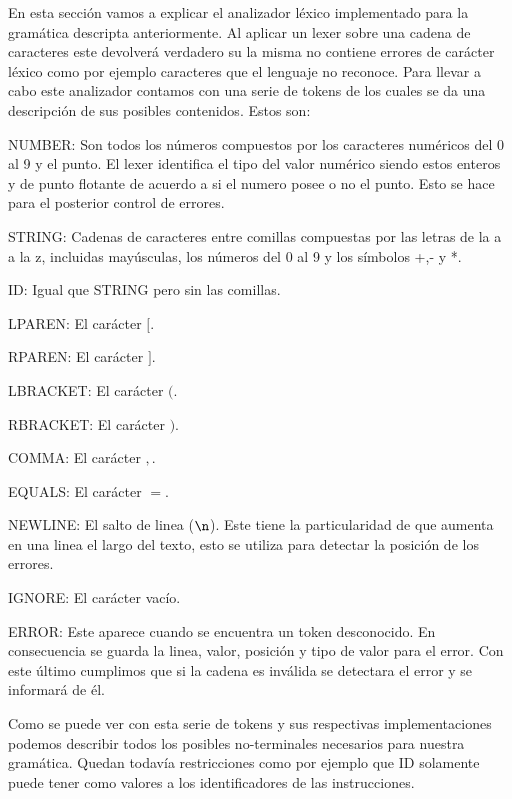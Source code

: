 En esta sección vamos a explicar el analizador léxico implementado para la gramática descripta anteriormente. Al aplicar un
lexer sobre una cadena de caracteres este devolverá verdadero su la misma no contiene errores de carácter léxico como por
ejemplo caracteres que el lenguaje no reconoce. Para llevar a cabo este analizador contamos con una serie de tokens de
los cuales se da una descripción de sus posibles contenidos. Estos son:

NUMBER: Son todos los números compuestos por los caracteres numéricos del 0 al 9 y el punto. El lexer identifica el tipo
del valor numérico siendo estos enteros y de punto flotante de acuerdo a si el numero posee o no el punto. Esto se hace
para el posterior control de errores.

STRING: Cadenas de caracteres entre comillas compuestas por las letras de la a a la z, incluidas mayúsculas, los números del
0 al 9 y los símbolos +,- y *.

ID: Igual que STRING pero sin las comillas.

LPAREN: El carácter $[$.

RPAREN: El carácter $]$.

LBRACKET: El carácter $($.

RBRACKET: El carácter $)$.

COMMA: El carácter $,$.

EQUALS: El carácter $=$.

NEWLINE: El salto de linea ($\n$). Este tiene la particularidad de que aumenta en una linea el largo del texto, esto se
utiliza para detectar la posición de los errores.

IGNORE: El carácter vacío.

ERROR: Este aparece cuando se encuentra un token desconocido. En consecuencia se guarda la linea, valor, posición y
tipo de valor para el error. Con este último cumplimos que si la cadena es inválida se detectara el error y se informará de él.

Como se puede ver con esta serie de tokens y sus respectivas implementaciones podemos describir todos los posibles no-terminales
necesarios para nuestra gramática. Quedan todavía restricciones como por ejemplo que ID solamente puede tener como valores a los
identificadores de las instrucciones.
